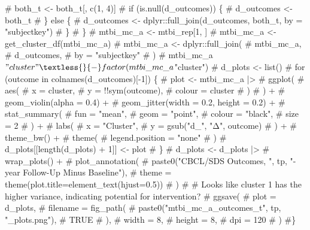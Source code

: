 \documentclass[
  letterpaper,
  DIV=11,
  numbers=noendperiod]{scrreprt}
\newenvironment{Shaded}{\begin{snugshade}}{\end{snugshade}}
\newcommand{\CommentTok}[1]{\textcolor[rgb]{0.37,0.37,0.37}{#1}}
\begin{document}
\begin{Shaded}
\begin{Highlighting}[]
\CommentTok{\#        both\_t \textless{}{-} both\_t[, c(1, 4)]}
\CommentTok{\#        if (is.null(d\_outcomes)) \{}
\CommentTok{\#            d\_outcomes \textless{}{-} both\_t}
\CommentTok{\#        \} else \{}
\CommentTok{\#            d\_outcomes \textless{}{-} dplyr::full\_join(d\_outcomes, both\_t, by = "subjectkey")}
\CommentTok{\#        \}}
\CommentTok{\#    \}}
\CommentTok{\#    mtbi\_mc\_a \textless{}{-} mtbi\_rep[1, ]}
\CommentTok{\#    mtbi\_mc\_a \textless{}{-} get\_cluster\_df(mtbi\_mc\_a)}
\CommentTok{\#    mtbi\_mc\_a \textless{}{-} dplyr::full\_join(}
\CommentTok{\#        mtbi\_mc\_a,}
\CommentTok{\#        d\_outcomes,}
\CommentTok{\#        by = "subjectkey"}
\CommentTok{\#    )}
\CommentTok{\#    mtbi\_mc\_a$"cluster" \textless{}{-} factor(mtbi\_mc\_a$"cluster")}
\CommentTok{\#    d\_plots \textless{}{-} list()}
\CommentTok{\#    for (outcome in colnames(d\_outcomes)[{-}1]) \{}
\CommentTok{\#        plot \textless{}{-} mtbi\_mc\_a |\textgreater{}}
\CommentTok{\#            ggplot(}
\CommentTok{\#                aes(}
\CommentTok{\#                    x = cluster,}
\CommentTok{\#                    y = !!sym(outcome),}
\CommentTok{\#                    colour = cluster}
\CommentTok{\#                )}
\CommentTok{\#            ) +}
\CommentTok{\#            geom\_violin(alpha = 0.4) +}
\CommentTok{\#            geom\_jitter(width = 0.2, height = 0.2) +}
\CommentTok{\#            stat\_summary(}
\CommentTok{\#                fun = "mean",}
\CommentTok{\#                geom = "point",}
\CommentTok{\#                colour = "black",}
\CommentTok{\#                size = 2}
\CommentTok{\#            ) +}
\CommentTok{\#            labs(}
\CommentTok{\#                x = "Cluster",}
\CommentTok{\#                y = gsub("d\_", "Δ", outcome)}
\CommentTok{\#            ) +}
\CommentTok{\#            theme\_bw() +}
\CommentTok{\#            theme(}
\CommentTok{\#                legend.position = "none"}
\CommentTok{\#            )}
\CommentTok{\#        d\_plots[[length(d\_plots) + 1]] \textless{}{-} plot}
\CommentTok{\#    \}}
\CommentTok{\#    d\_plots \textless{}{-} d\_plots |\textgreater{}}
\CommentTok{\#        wrap\_plots() +}
\CommentTok{\#        plot\_annotation(}
\CommentTok{\#            paste0("CBCL/SDS Outcomes, ", tp, "{-}year Follow{-}Up Minus Baseline"),}
\CommentTok{\#            theme = theme(plot.title=element\_text(hjust=0.5))}
\CommentTok{\#        )}
\CommentTok{\#    \# Looks like cluster 1 has the higher variance, indicating potential for intervention?}
\CommentTok{\#    ggsave(}
\CommentTok{\#        plot = d\_plots,}
\CommentTok{\#        filename = fig\_path(}
\CommentTok{\#            paste0("mtbi\_mc\_a\_outcomes\_t", tp, "\_plots.png"),}
\CommentTok{\#            TRUE}
\CommentTok{\#        ),}
\CommentTok{\#        width = 8,}
\CommentTok{\#        height = 8,}
\CommentTok{\#        dpi = 120}
\CommentTok{\#    )}
\CommentTok{\#\}}
\end{Highlighting}
\end{Shaded}
\end{document}
